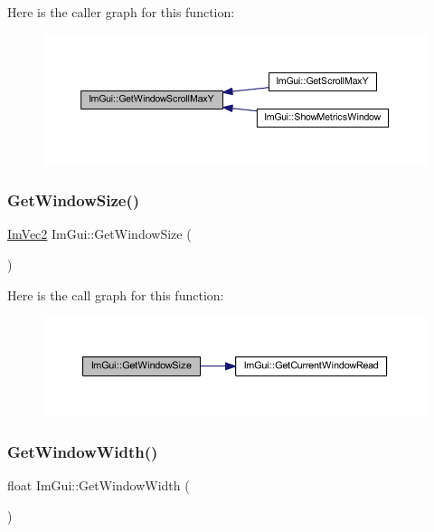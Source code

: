 Here is the caller graph for this function\+:
\nopagebreak
\begin{figure}[H]
\begin{center}
\leavevmode
\includegraphics[width=350pt]{namespace_im_gui_a1016c33aeb30e58a7aa4a66adceed436_icgraph}
\end{center}
\end{figure}
\mbox{\label{namespace_im_gui_aaa5c0bfac7125ba9850a08b6db2e90c9}} 
\subsubsection{\texorpdfstring{Get\+Window\+Size()}{GetWindowSize()}}
{\footnotesize\ttfamily \mbox{\hyperlink{struct_im_vec2}{Im\+Vec2}} Im\+Gui\+::\+Get\+Window\+Size (\begin{DoxyParamCaption}{ }\end{DoxyParamCaption})}

Here is the call graph for this function\+:
\nopagebreak
\begin{figure}[H]
\begin{center}
\leavevmode
\includegraphics[width=350pt]{namespace_im_gui_aaa5c0bfac7125ba9850a08b6db2e90c9_cgraph}
\end{center}
\end{figure}
\mbox{\label{namespace_im_gui_a471ff23945b99541c506dbdc2a9004cf}} 
\subsubsection{\texorpdfstring{Get\+Window\+Width()}{GetWindowWidth()}}
{\footnotesize\ttfamily float Im\+Gui\+::\+Get\+Window\+Width (\begin{DoxyParamCaption}{ }\end{DoxyParamCaption})}

